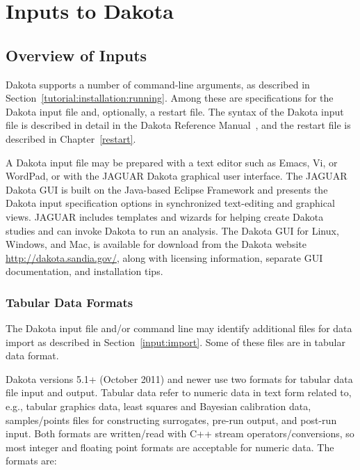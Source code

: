 \chapter{Inputs to Dakota}\label{input}

\section{Overview of Inputs}\label{input:overview}

Dakota supports a number of command-line arguments, as described in
Section~\ref{tutorial:installation:running}.  Among these are
specifications for the Dakota input file and, optionally, a restart
file.  The syntax of the Dakota input file is described in detail in
the Dakota Reference Manual~\cite{RefMan}, and the restart file is
described in Chapter~\ref{restart}.

A Dakota input file may be prepared with a text editor such as Emacs,
Vi, or WordPad, or with the JAGUAR Dakota graphical user interface.
The JAGUAR Dakota GUI is built on the Java-based Eclipse Framework
\cite{Eclipse} and presents the Dakota input specification options in
synchronized text-editing and graphical views.  JAGUAR includes
templates and wizards for helping create Dakota studies and can invoke
Dakota to run an analysis.  The Dakota GUI for Linux, Windows, and
Mac, is available for download from the Dakota website
\url{http://dakota.sandia.gov/}, along with licensing information,
separate GUI documentation, and installation tips.

\subsection{Tabular Data Formats}\label{input:tabularformat}

The Dakota input file and/or command line may identify additional
files for data import as described in Section~\ref{input:import}.
Some of these files are in tabular data format.

Dakota versions 5.1+ (October 2011) and newer use two formats for
tabular data file input and output.  Tabular data refer to numeric
data in text form related to, e.g., tabular graphics data, least
squares and Bayesian calibration data, samples/points files for
constructing surrogates, pre-run output, and post-run input.  Both
formats are written/read with C++ stream operators/conversions, so
most integer and floating point formats are acceptable for numeric
data.  The formats are:

